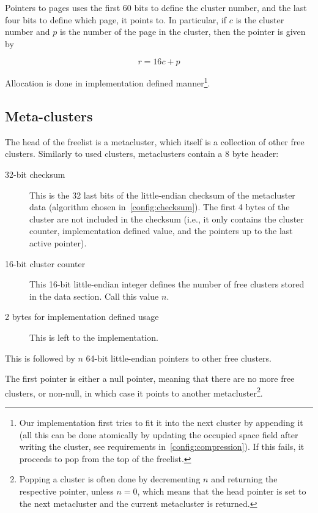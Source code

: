\documentclass[11pt,a4paper]{report}
\newcommand{\maxpagesincluster}{16 }
\begin{document}
        Pointers to pages uses the first 60 bits to define the cluster number,
        and the last four bits to define which page, it points to. In
        particular, if $c$ is the cluster number and $p$ is the number of the
        page in the cluster, then the pointer is given by

        $$r = \maxpagesincluster c + p$$

        Allocation is done in implementation defined manner\footnote{Our
        implementation first tries to fit it into the next cluster by
        appending it (all this can be done atomically by updating the
        occupied space field after writing the cluster, see requirements
        in~\ref{config:compression}). If this fails, it proceeds to pop
        from the top of the freelist.}.

        \subsection{Meta-clusters}
        \label{cluster:metacluster}
        The head of the freelist is a metacluster, which itself is a collection
        of other free clusters. Similarly to used clusters, metaclusters
        contain a 8 byte header:

        \begin{description}
            \item [32-bit checksum] This is the 32 last bits of the
                little-endian checksum of the metacluster data (algorithm
                chosen in~\ref{config:checksum}). The first 4 bytes of the
                cluster are not included in the checksum (i.e., it only
                contains the cluster counter, implementation defined value, and
                the pointers up to the last active pointer).
            \item [16-bit cluster counter] This 16-bit little-endian integer
                defines the number of free clusters stored in the data section.
                Call this value $n$.
            \item [2 bytes for implementation defined usage] This is
                left to the implementation.
        \end{description}

        This is followed by $n$ 64-bit little-endian pointers to other free
        clusters.

        The first pointer is either a null pointer, meaning that there are no
        more free clusters, or non-null, in which case it points to another
        metacluster\footnote{Popping a cluster is often done by decrementing
        $n$ and returning the respective pointer, unless $n = 0$, which means
        that the head pointer is set to the next metacluster and the current
        metacluster is returned.}.
\end{document}
